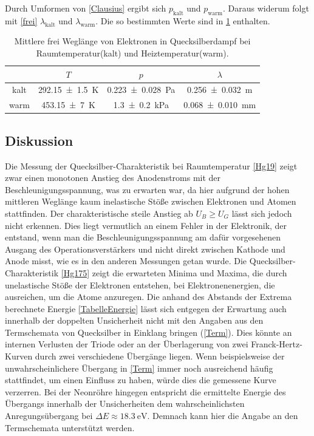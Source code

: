 \documentclass[
	a4paper,
	12pt,
	pagesize,
	ngerman
]{scrartcl}
\begin{document}
	Durch Umformen von \cref{Clausius} ergibt sich $p_\text{kalt}$ und $p_\text{warm}$.
	Daraus widerum folgt mit \cref{frei} $\lambda_\text{kalt}$ und $\lambda_\text{warm}$.
	Die so bestimmten Werte sind in \cref{TabelleFrei} enthalten.
	
	\begin{table}[H]
		\centering
		\begin{tabular}{ c | c | c | c }
			&$T$ & $p$ &  $\lambda$ \\ \hline
			kalt&\SI{292.15 +- 1,5}{K} &\SI{0,223+-0,028}{Pa} &  \SI{0,256+- 0,032}{m} \\
			warm&\SI{453.15+- 7}{K} & \SI{1,3+-0,2}{kPa} & \SI{0,068 +- 0,010}{mm} \\
		\end{tabular}
		\caption{Mittlere frei Weglänge von Elektronen in Quecksilberdampf bei Raumtemperatur(kalt) und Heiztemperatur(warm).}
		\label{TabelleFrei} 
	\end{table}
	
	
	
	\subsection{Diskussion}
	Die Messung der Quecksilber-Charakteristik bei Raumtemperatur \cref{Hg19} zeigt zwar einen monotonen Anstieg des Anodenstroms mit der Beschleunigungsspannung, was zu erwarten war, da hier aufgrund der hohen mittleren Weglänge kaum inelastische Stöße zwischen Elektronen und Atomen stattfinden. %
	Der charakteristische steile Anstieg ab $U_B \geq U_G$ lässt sich jedoch nicht erkennen.
	Dies liegt vermutlich an einem Fehler in der Elektronik, der entstand, wenn man die Beschleunigungsspannung am dafür vorgesehenen Ausgang des Operationsverstärkers und nicht direkt zwischen Kathode und Anode misst, wie es in den anderen Messungen getan wurde.
	\newline
	Die Quecksilber-Charakteristik \cref{Hg175} zeigt die erwarteten Minima und Maxima, die durch unelastische Stöße der Elektronen entstehen, bei Elektronenenergien, die ausreichen, um die Atome anzuregen.
	Die anhand des Abstands der Extrema berechnete Energie \cref{TabelleEnergie} lässt sich entgegen der Erwartung auch innerhalb der doppelten Unsicherheit nicht mit den Angaben aus den Termschemata von Quecksilber in Einklang bringen (\cref{Term}).
	Dies könnte an internen Verlusten der Triode oder an der Überlagerung von zwei Franck-Hertz-Kurven durch zwei verschiedene Übergänge liegen.
	Wenn beispielsweise der unwahrscheinlichere Übergang in \cref{Term} immer noch ausreichend häufig stattfindet, um einen Einfluss zu haben, würde dies die gemessene Kurve verzerren.
	\newline
	Bei der Neonröhre hingegen entspricht die ermittelte Energie des Übergangs innerhalb der Unsicherheiten dem wahrscheinlichsten Anregungsübergang bei $ \Delta E \approx \SI{18,3}{\electronvolt}$.
	Demnach kann hier die Angabe an den Termschemata unterstützt werden.
	
\end{document}
